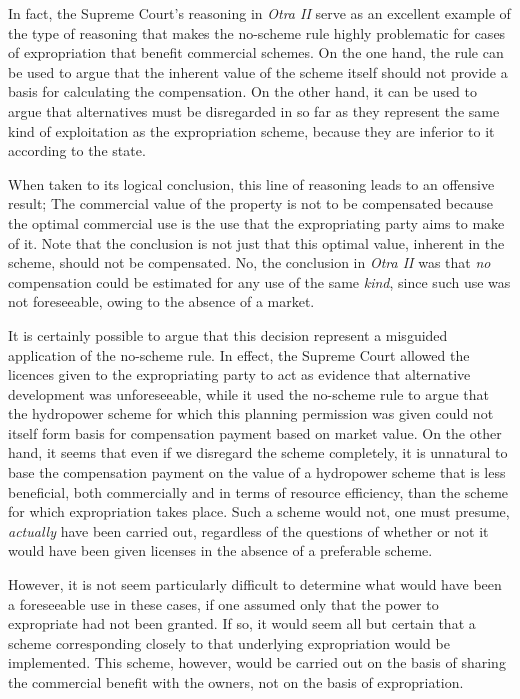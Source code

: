 In fact, the Supreme Court's reasoning in \emph{Otra II} serve as an excellent example of the type of reasoning that makes the no-scheme rule highly problematic for cases of expropriation that benefit commercial schemes. On the one hand, the rule can be used to argue that the inherent value of the scheme itself should not provide a basis for calculating the compensation. On the other hand, it can be used to argue that alternatives must be disregarded in so far as they represent the same kind of exploitation as the expropriation scheme, because they are inferior to it according to the state.

When taken to its logical conclusion, this line of reasoning leads to an offensive result; The commercial value of the property is not to be compensated because the optimal commercial use is the use that the expropriating party aims to make of it. Note that the conclusion is not just that this optimal value, inherent in the scheme, should not be compensated. No, the conclusion in \emph{Otra II} was that \emph{no} compensation could be estimated for any use of the same \emph{kind}, since such use was not foreseeable, owing to the absence of a market.

It is certainly possible to argue that this decision represent a misguided application of the no-scheme rule. In effect, the Supreme Court allowed the licences given to the expropriating party to act as evidence that alternative development was unforeseeable, while it used the no-scheme rule to argue that the hydropower scheme for which this planning permission was given could not itself form basis for compensation payment based on market value.  On the other hand, it seems that even if we disregard the scheme completely, it is unnatural to base the compensation payment on the value of a hydropower scheme that is less beneficial, both commercially and in terms of resource efficiency, than the scheme for which expropriation takes place. Such a scheme would not, one must presume, \emph{actually} have been carried out, regardless of the questions of whether or not it would have been given licenses in the absence of a preferable scheme. 

However, it is not seem particularly difficult to determine what would have been a foreseeable use in these cases, if one assumed only that the power to expropriate had not been granted. If so, it would seem all but certain that a scheme corresponding closely to that underlying expropriation would be implemented. This scheme, however, would be carried out on the basis of sharing the commercial benefit with the owners, not on the basis of expropriation. 

